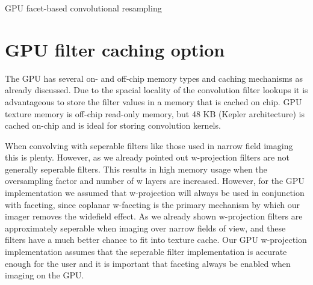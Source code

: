 \begin{algorithm}
\begin{algorithmic}
	    \ENDIF
	 \ENDIF
      \ENDFOR %
    \ENDFOR %
    \ENDIF
    \STATE {Let $u_\text{prev} = u_\text{int}, v_\text{prev} = v_\text{int}, (\forall x \in [0...N_\text{cross correlations}-1))vis_x = 0+0i$}
  \ENDFOR %
 \end{algorithmic}
 \caption{GPU facet-based convolutional resampling}
 \label{ALG_GRIDDING_GPU}
\end{algorithm}
\section{GPU filter caching option}
The GPU has several on- and off-chip memory types and caching mechanisms as already discussed. Due to the spacial locality of the convolution filter lookups it is advantageous to
store the filter values in a memory that is cached on chip. GPU texture memory is off-chip read-only memory, but 48 KB (Kepler architecture) is 
cached on-chip and is ideal for storing convolution kernels. 

When convolving with seperable filters like those used in narrow field imaging this is plenty. However, as we already pointed out
w-projection filters are not generally seperable filters. This results in high memory usage when the oversampling factor and number of w layers are 
increased. However, for the GPU implementation we assumed that w-projection will always be used in conjunction with faceting, since coplanar w-faceting
is the primary mechanism by which our imager removes the widefield effect. As we already shown w-projection filters are approximately seperable when 
imaging over narrow fields of view, and these filters have a much better chance to fit into texture cache. Our GPU w-projection implementation
assumes that the seperable filter implementation is accurate enough for the user and it is important that faceting always be enabled when imaging on 
the GPU.

